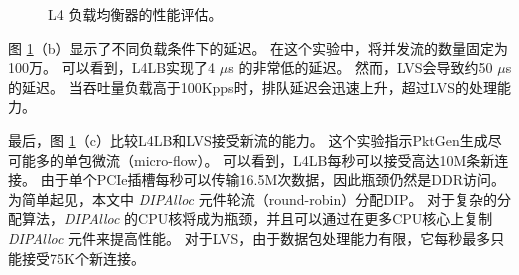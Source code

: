 \begin{figure}[htbp]
	\centering
	
	
	
	\caption{L4 负载均衡器的性能评估。}
	\label{clicknp:fig:l4}
	
\end{figure}



图 \ref {clicknp:fig:l4}（b）显示了不同负载条件下的延迟。
在这个实验中，将并发流的数量固定为100万。
可以看到，L4LB实现了4 $\mu$s 的非常低的延迟。
然而，LVS会导致约50 $\mu$s 的延迟。
当吞吐量负载高于100Kpps时，排队延迟会迅速上升，超过LVS的处理能力。

最后，图 \ref {clicknp:fig:l4}（c）比较L4LB和LVS接受新流的能力。
这个实验指示PktGen生成尽可能多的单包微流（micro-flow）。
可以看到，L4LB每秒可以接受高达10M条新连接。
由于单个PCIe插槽每秒可以传输16.5M次数据，因此瓶颈仍然是DDR访问。
为简单起见，本文中 \textit {DIPAlloc} 元件轮流（round-robin）分配DIP。
对于复杂的分配算法，\textit {DIPAlloc} 的CPU核将成为瓶颈，并且可以通过在更多CPU核心上复制 \textit {DIPAlloc} 元件来提高性能。
对于LVS，由于数据包处理能力有限，它每秒最多只能接受75K个新连接。



